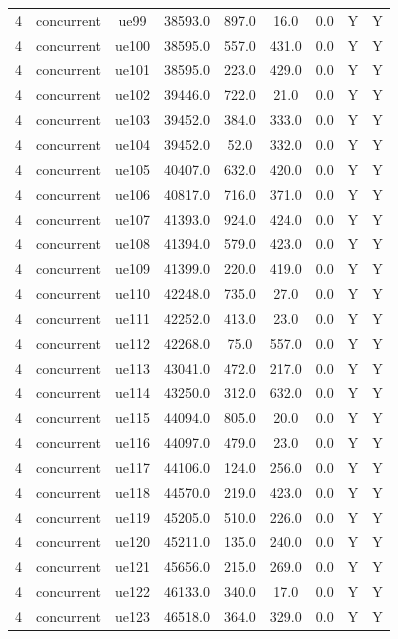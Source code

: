 \begin{table}[ht]
\begin{tabular}{|c|c|c|c|c|c|c|c|c|}
4 & concurrent & ue99 & 38593.0 & 897.0 & 16.0 & 0.0 & Y & Y \\
4 & concurrent & ue100 & 38595.0 & 557.0 & 431.0 & 0.0 & Y & Y \\
4 & concurrent & ue101 & 38595.0 & 223.0 & 429.0 & 0.0 & Y & Y \\
4 & concurrent & ue102 & 39446.0 & 722.0 & 21.0 & 0.0 & Y & Y \\
4 & concurrent & ue103 & 39452.0 & 384.0 & 333.0 & 0.0 & Y & Y \\
4 & concurrent & ue104 & 39452.0 & 52.0 & 332.0 & 0.0 & Y & Y \\
4 & concurrent & ue105 & 40407.0 & 632.0 & 420.0 & 0.0 & Y & Y \\
4 & concurrent & ue106 & 40817.0 & 716.0 & 371.0 & 0.0 & Y & Y \\
4 & concurrent & ue107 & 41393.0 & 924.0 & 424.0 & 0.0 & Y & Y \\
4 & concurrent & ue108 & 41394.0 & 579.0 & 423.0 & 0.0 & Y & Y \\
4 & concurrent & ue109 & 41399.0 & 220.0 & 419.0 & 0.0 & Y & Y \\
4 & concurrent & ue110 & 42248.0 & 735.0 & 27.0 & 0.0 & Y & Y \\
4 & concurrent & ue111 & 42252.0 & 413.0 & 23.0 & 0.0 & Y & Y \\
4 & concurrent & ue112 & 42268.0 & 75.0 & 557.0 & 0.0 & Y & Y \\
4 & concurrent & ue113 & 43041.0 & 472.0 & 217.0 & 0.0 & Y & Y \\
4 & concurrent & ue114 & 43250.0 & 312.0 & 632.0 & 0.0 & Y & Y \\
4 & concurrent & ue115 & 44094.0 & 805.0 & 20.0 & 0.0 & Y & Y \\
4 & concurrent & ue116 & 44097.0 & 479.0 & 23.0 & 0.0 & Y & Y \\
4 & concurrent & ue117 & 44106.0 & 124.0 & 256.0 & 0.0 & Y & Y \\
4 & concurrent & ue118 & 44570.0 & 219.0 & 423.0 & 0.0 & Y & Y \\
4 & concurrent & ue119 & 45205.0 & 510.0 & 226.0 & 0.0 & Y & Y \\
4 & concurrent & ue120 & 45211.0 & 135.0 & 240.0 & 0.0 & Y & Y \\
4 & concurrent & ue121 & 45656.0 & 215.0 & 269.0 & 0.0 & Y & Y \\
4 & concurrent & ue122 & 46133.0 & 340.0 & 17.0 & 0.0 & Y & Y \\
4 & concurrent & ue123 & 46518.0 & 364.0 & 329.0 & 0.0 & Y & Y \\

\end{tabular}
\end{table}
